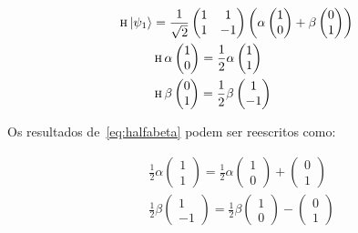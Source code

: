 \begin{align}\label{eq:halfabeta}
\operatorname{\textsc{h}} \ket{\psi_1} &= \frac{1}{\sqrt{2}} \begin{pmatrix}
1 & 1 \\
1 & -1
\end{pmatrix} \left(\alpha \begin{pmatrix}
1 \\
0 
\end{pmatrix} + \beta \begin{pmatrix}
0 \\
1
\end{pmatrix} \right) \nonumber \\
&\operatorname{\textsc{h}} \alpha \begin{pmatrix}
1 \\
0 
\end{pmatrix} = \frac{1}{2} \alpha \begin{pmatrix}
1 \\
1 
\end{pmatrix} \nonumber \\ 
&\operatorname{\textsc{h}} \beta \begin{pmatrix}
0 \\
1
\end{pmatrix} =  \frac{1}{2} \beta \begin{pmatrix}
1 \\
-1
\end{pmatrix} 
\end{align}

Os resultados de~\eqref{eq:halfabeta} podem ser reescritos como:

\begin{align} \label{eq:alfabetasoma}
&\frac{1}{2} \alpha \begin{pmatrix}
1 \\
1 
\end{pmatrix} = \frac{1}{2} \alpha \begin{pmatrix}
1 \\
0 
\end{pmatrix} + \begin{pmatrix}
0 \\
1 
\end{pmatrix} \nonumber \\
&\frac{1}{2} \beta \begin{pmatrix}
1 \\
-1
\end{pmatrix} = \frac{1}{2} \beta \begin{pmatrix}
1 \\
0
\end{pmatrix} - \begin{pmatrix}
0 \\
1
\end{pmatrix} 
\end{align}

